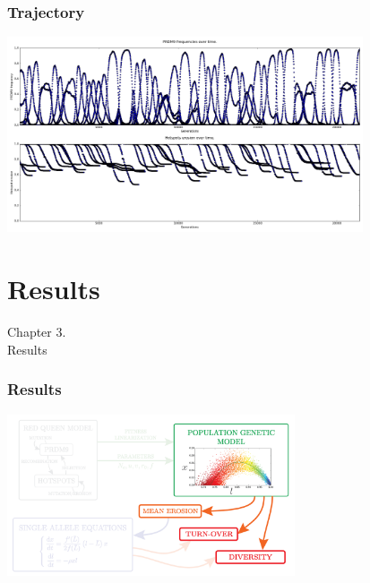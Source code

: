 \documentclass[10pt]{beamer}
\begin{document}
\begin{frame}
	\frametitle{Trajectory}
	\begin{center}
       \includegraphics[width=10.5cm]{Images/simulations.png}
	\end{center}
\end{frame}

\section{Results}

\begin{frame}
	\begin{center}
	\huge
	Chapter 3. \\
       Results
	\end{center}
\end{frame}


\begin{frame}
\frametitle{Results}
	\begin{center}
       \includegraphics[width=8.5cm]{Images/overline-3.png}
	\end{center}
\end{frame}
\end{document}
